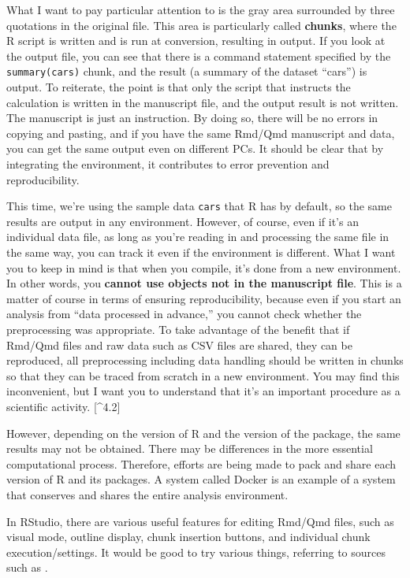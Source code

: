 \documentclass[
  a4paper,
]{book}
\begin{document}
What I want to pay particular attention to is the gray area surrounded
by three quotations in the original file. This area is particularly
called \textbf{chunks}, where the R script is written and is run at
conversion, resulting in output. If you look at the output file, you can
see that there is a command statement specified by the
\texttt{summary(cars)} chunk, and the result (a summary of the dataset
``cars'') is output. To reiterate, the point is that only the script
that instructs the calculation is written in the manuscript file, and
the output result is not written. The manuscript is just an instruction.
By doing so, there will be no errors in copying and pasting, and if you
have the same Rmd/Qmd manuscript and data, you can get the same output
even on different PCs. It should be clear that by integrating the
environment, it contributes to error prevention and reproducibility.

This time, we're using the sample data \texttt{cars} that R has by
default, so the same results are output in any environment. However, of
course, even if it's an individual data file, as long as you're reading
in and processing the same file in the same way, you can track it even
if the environment is different. What I want you to keep in mind is that
when you compile, it's done from a new environment. In other words, you
\textbf{cannot use objects not in the manuscript file}. This is a matter
of course in terms of ensuring reproducibility, because even if you
start an analysis from ``data processed in advance,'' you cannot check
whether the preprocessing was appropriate. To take advantage of the
benefit that if Rmd/Qmd files and raw data such as CSV files are shared,
they can be reproduced, all preprocessing including data handling should
be written in chunks so that they can be traced from scratch in a new
environment. You may find this inconvenient, but I want you to
understand that it's an important procedure as a scientific activity.
{[}\^{}4.2{]}

However, depending on the version of R and the version of the package,
the same results may not be obtained. There may be differences in the
more essential computational process. Therefore, efforts are being made
to pack and share each version of R and its packages. A system called
Docker is an example of a system that conserves and shares the entire
analysis environment.

In RStudio, there are various useful features for editing Rmd/Qmd files,
such as visual mode, outline display, chunk insertion buttons, and
individual chunk execution/settings. It would be good to try various
things, referring to sources such as \textcite{Takahashi201805}.
\end{document}
